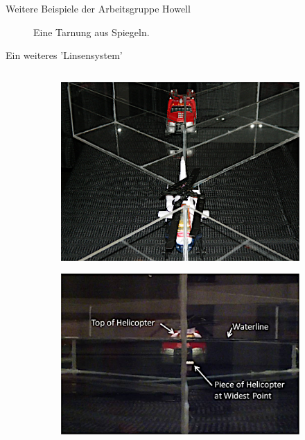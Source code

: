 \begin{frame}{Weitere Beispiele der Arbeitsgruppe Howell}
\begin{figure}
\begin{subfigure}{0.48\textwidth}
        \end{subfigure}
        \caption{Eine Tarnung aus Spiegeln.}
    \end{figure}
\end{frame}

\begin{frame}{Ein weiteres 'Linsensystem'}
    \begin{columns}
        \begin{column}{0.48\textwidth}
            \begin{figure}
                \centering
                \begin{subfigure}{\textwidth}
                    \centering
                    \includegraphics[height=0.4\textheight]{images/fresnel-oben.png}
                \end{subfigure}
                \begin{subfigure}{\textwidth}
                    \centering
                    \includegraphics[height=0.4\textheight]{images/fresnel-vorne.png}

\end{subfigure}
\end{figure}
\end{column}
\end{columns}
\end{frame}
